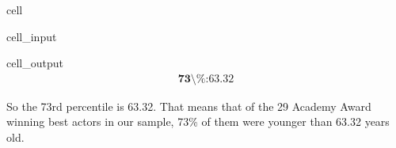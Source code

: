 \documentclass[letterpaper,10pt,english]{jupyterBook}
\begin{document}
\begin{sphinxuseclass}{cell}\begin{sphinxVerbatimInput}

\begin{sphinxuseclass}{cell_input}
\begin{sphinxVerbatim}[commandchars=\\\{\}]

\end{sphinxVerbatim}

\end{sphinxuseclass}\end{sphinxVerbatimInput}
\begin{sphinxVerbatimOutput}

\begin{sphinxuseclass}{cell_output}\begin{equation*}
\begin{split}\textbf{73\textbackslash{}\%:} 63.32\end{split}
\end{equation*}
\end{sphinxuseclass}\end{sphinxVerbatimOutput}

\end{sphinxuseclass}
\sphinxAtStartPar
So the 73rd percentile is 63.32. That means that of the 29 Academy Award winning best actors in our sample, 73\% of them were younger than 63.32 years old.
\end{document}
